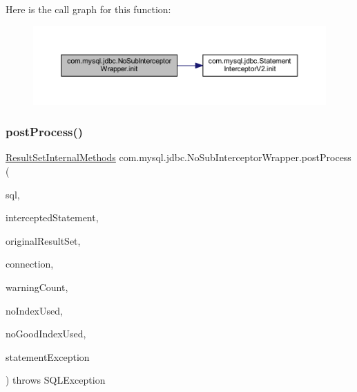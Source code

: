 Here is the call graph for this function\+:
\nopagebreak
\begin{figure}[H]
\begin{center}
\leavevmode
\includegraphics[width=350pt]{classcom_1_1mysql_1_1jdbc_1_1_no_sub_interceptor_wrapper_a7272676b9081fbf866a494f4d35b3a6d_cgraph}
\end{center}
\end{figure}
\mbox{\label{classcom_1_1mysql_1_1jdbc_1_1_no_sub_interceptor_wrapper_ad422f02c34900ee0adb87481762f09a7}} 
\subsubsection{\texorpdfstring{post\+Process()}{postProcess()}}
{\footnotesize\ttfamily \mbox{\hyperlink{interfacecom_1_1mysql_1_1jdbc_1_1_result_set_internal_methods}{Result\+Set\+Internal\+Methods}} com.\+mysql.\+jdbc.\+No\+Sub\+Interceptor\+Wrapper.\+post\+Process (\begin{DoxyParamCaption}\item[{String}]{sql,  }\item[{\mbox{\hyperlink{interfacecom_1_1mysql_1_1jdbc_1_1_statement}{Statement}}}]{intercepted\+Statement,  }\item[{\mbox{\hyperlink{interfacecom_1_1mysql_1_1jdbc_1_1_result_set_internal_methods}{Result\+Set\+Internal\+Methods}}}]{original\+Result\+Set,  }\item[{\mbox{\hyperlink{interfacecom_1_1mysql_1_1jdbc_1_1_connection}{Connection}}}]{connection,  }\item[{int}]{warning\+Count,  }\item[{boolean}]{no\+Index\+Used,  }\item[{boolean}]{no\+Good\+Index\+Used,  }\item[{S\+Q\+L\+Exception}]{statement\+Exception }\end{DoxyParamCaption}) throws S\+Q\+L\+Exception}

